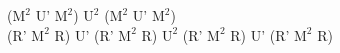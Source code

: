 ($\text{M}^2$ U' $\text{M}^2$) $\text{U}^2$ ($\text{M}^2$ U' $\text{M}^2$)\\
(R' $\text{M}^2$ R) U' (R' $\text{M}^2$ R) $\text{U}^2$ (R' $\text{M}^2$ R) U' (R' $\text{M}^2$ R)\\
